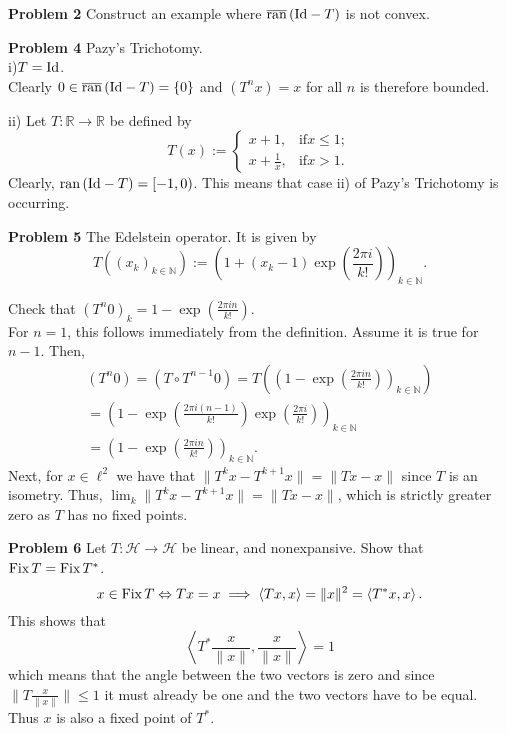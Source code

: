 \documentclass{scrartcl}
\newcommand{\N}{\mathbb{N}}
\newcommand{\R}{\mathbb{R}}
\renewcommand{\H}{\mathcal{H}}
\theoremstyle{plain}
\theoremstyle{remark}
\newcommand{\Id}{\textup{Id}}
\newcommand{\ran}{\textup{ran}\,}
\newcommand{\clran}{\overline{\textup{ran}}\,}
\newcommand{\Fix}{\textup{Fix}\,}
\begin{document}
\textbf{Problem 2} Construct an example where $\clran(\Id - T)$ is not convex.




\textbf{Problem 4} Pazy's Trichotomy.\\
i)$T=\Id$.\\
Clearly $0 \in \clran(\Id - T) = \{0\}$ and $(T^{n}x) = x$ for all $n$ is therefore bounded.

ii) Let $T: \R \to \R$  be defined by
\begin{equation}
  T(x) := 
  \begin{cases}
    x+1, & \text{if} x\le1; \\
    x+\frac{1}{x}, & \text{if} x > 1.
  \end{cases}
\end{equation}
Clearly, $\ran(\Id - T) = [-1, 0)$.
This means that case ii) of Pazy's Trichotomy is occurring.



\textbf{Problem 5} The Edelstein operator.
It is given by 
\begin{equation}
  T\left({(x_{k})}_{k \in \N}\right) := {\left( 1 + (x_{k} - 1)\exp \left(\frac{2 \pi i}{k!}\right)\right)}_{k \in \N}.
\end{equation}

Check that ${(T^{n}0)}_{k} = 1 - \exp \left(\frac{2 \pi i n}{k!}\right)$.\\

For $n=1$, this follows immediately from the definition.
Assume it is true for $n-1$. Then,
\begin{equation}
  \begin{aligned}
    {(T^{n}0)} = {(T \circ T^{n-1}0)} = T \left( {\left(1 - \exp \left(\frac{2 \pi i n}{k!}\right)\right)}_{k \in \N} \right) \\
    = {\left( 1 - \exp\left(\frac{2 \pi i (n-1)}{k!}\right)\exp \left(\frac{2 \pi i}{k!}\right)\right)}_{k \in \N} \\
    = {\left( 1 - \exp \left(\frac{2 \pi i n }{k!}\right)\right)}_{k \in \N}.
  \end{aligned}
\end{equation}
Next, for $x \in \ell^2$ we have that $\lVert T^{k}x - T^{k+1}x \rVert = \lVert Tx - x \rVert$ since $T$ is an isometry.
Thus, $\lim_{k} \lVert T^{k}x - T^{k+1}x \rVert = \lVert Tx - x \rVert$, which is strictly greater zero as $T$ has no fixed points.


\textbf{Problem 6} Let $T: \H \to \H$ be linear, and nonexpansive. Show that $\Fix T = \Fix T^*$.
\begin{equation}
  x \in \Fix T \Leftrightarrow Tx=x \implies \left\langle Tx, x \right\rangle = \lVert x \rVert^2 = \left\langle T^*x, x \right\rangle.
\end{equation}
This shows that 
\begin{equation}
  \left\langle T^*\frac{x}{\lVert x \rVert}, \frac{x}{\lVert x \rVert} \right\rangle = 1
\end{equation}
which means that the angle between the two vectors is zero and since $\lVert T \frac{x}{\lVert x \rVert} \rVert \le 1$ it must already be one and the two vectors have to be equal. Thus $x$ is also a fixed point of $T^*$.
\end{document}
